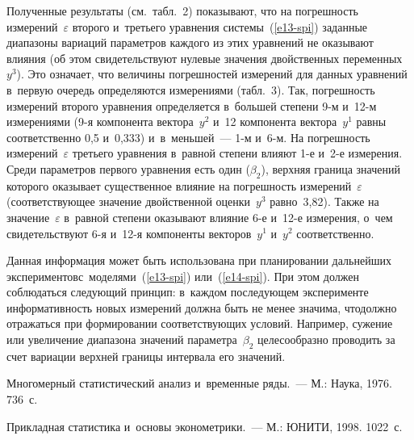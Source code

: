\begin{multicols}{2}
  Полученные результаты (см.\ табл.~2) показывают, что на погрешность
измерений~$\varepsilon$ второго и~третьего уравнения системы~(\ref{e13-spi})
заданные диапазоны вариаций параметров каждого из этих уравнений не
оказывают влияния (об этом свидетельствуют нулевые значения двойственных
переменных~$y^3$). Это означает, что величины погрешностей измерений для
данных уравнений в~первую очередь определяются измерениями (табл.~3). Так,
погрешность измерений второго уравнения определяется в~большей степени
  9-м и~12-м измерениями (9-я компонента вектора~$y^2$ и~12 компонента
вектора~$y^1$ равны соответственно 0,5 и~0,333) и~в~меньшей~--- 1-м и~\mbox{6-м}.
На погрешность измерений~$\varepsilon$ третьего уравнения в~равной степени
влияют 1-е и~2-е измерения. Среди параметров первого уравнения есть один
($\beta_2$), верхняя граница значений которого оказывает существенное
влияние на погрешность измерений~$\varepsilon$ (соответствующее значение
двойственной оценки~$y^3$ равно~3,82). Также на значение~$\varepsilon$
в~равной степени оказывают влияние 6-е и~12-е измерения, о~чем
свидетельствуют 6-я и~12-я компоненты векторов~$y^1$ и~$y^2$
соответственно.



  Данная информация может быть использована при планировании дальнейших
экспериментов\linebreak с~моделями~(\ref{e13-spi}) или~(\ref{e14-spi}). При этом должен
соблюдаться следующий принцип: в~каждом после\-дующем эксперименте
информативность новых измере\-ний должна быть не менее значима, что\linebreak должно
отражаться при формировании соответствующих условий. Например, сужение
или увеличение диапазона значений параметра~$\beta_2$ целесообразно
проводить за счет вариации верхней \mbox{границы} интервала его значений.

\vspace*{-9pt}

{\small\frenchspacing
 {%
 \begin{thebibliography}{99}

 \vspace*{-2pt}

 Многомерный статистический анализ и~временные ряды.~--- М.: Наука, 1976. 736~с.

 Прикладная статистика и~основы
эконометрики.~--- М.: ЮНИТИ, 1998. 1022~с.


\end{thebibliography}}}
\end{multicols}

